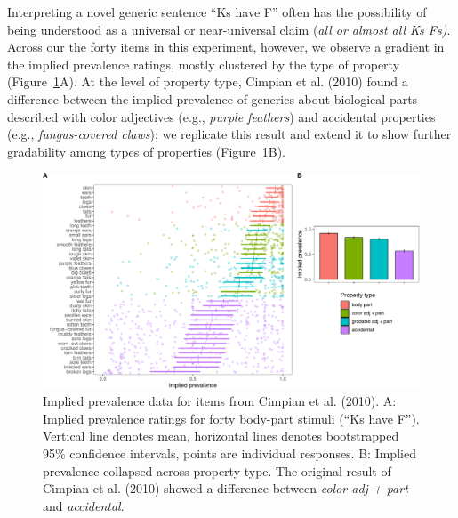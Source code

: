 \documentclass[floatsintext,doc]{apa6}
\begin{document}
Interpreting a novel generic sentence \enquote{Ks have F} often has the possibility of being understood as a universal or near-universal claim (\emph{all or almost all Ks Fs)}.
Across our the forty items in this experiment, however, we observe a gradient in the implied prevalence ratings, mostly clustered by the type of property (Figure~\ref{fig:cimpian-modelingResults}A).
At the level of property type, Cimpian et al. (2010) found a difference between the implied prevalence of generics about biological parts described with color adjectives (e.g., \emph{purple feathers}) and accidental properties (e.g., \emph{fungus-covered claws});  we replicate this result and extend it to show further gradability among types of properties (Figure~\ref{fig:cimpian-modelingResults}B).

\begin{figure}
\centering
\includegraphics{genint_files/figure-latex/cimpian-modelingResults-1.pdf}
\caption{\label{fig:cimpian-modelingResults}Implied prevalence data for items from Cimpian et al. (2010). A: Implied prevalence ratings for forty body-part stimuli (\enquote{Ks have F}). Vertical line denotes mean, horizontal lines denotes bootstrapped 95\% confidence intervals, points are individual responses. B: Implied prevalence collapsed across property type. The original result of Cimpian et al. (2010) showed a difference between \emph{color adj + part} and \emph{accidental}.}
\end{figure}
\end{document}
